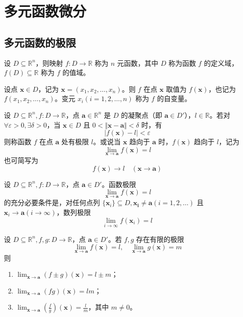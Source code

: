 \chapter{多元函数微分}


\section{多元函数的极限}

\begin{definition}
    设 $D \subseteq \mathbb{R}^n$，则映射 $f: D \to \mathbb{R}$ 称为 $n$ 元函数，其中 $D$ 称为函数 $f$ 的定义域，$f(D) \subseteq \mathbb{R}$ 称为 $f$ 的值域。

    设点 $\bm{x} \in D$，记为 $\bm{x} = (x_1, x_2, \ldots, x_n)$。则 $f$ 在点 $\bm{x}$ 取值为 $f(\bm{x})$，也记为 $f(x_1, x_2, \ldots, x_n)$。变元 $x_{i}(i = 1, 2, \ldots, n)$ 称为 $f$ 的自变量。
\end{definition}

\begin{definition}
    设 $D \subseteq \mathbb{R}^n, f: D \to \mathbb{R}$，点 $\bm{a} \in \mathbb{R}^n$ 是 $D$ 的凝聚点（即 $\bm{a} \in D'$），$l \in \mathbb{R}$。若对 $\forall \varepsilon > 0, \exists \delta > 0$，当 $\bm{x} \in D$ 且 $0 < \Vert \bm{x} - \bm{a} \Vert < \delta$ 时，有
    \[
        \vert f(\bm{x}) - l \vert < \varepsilon
    \]
    则称函数 $f$ 在点 $\bm{a}$ 处有极限 $l$。或说当 $\bm{x}$ 趋向于 $\bm{a}$ 时，$f(\bm{x})$ 趋向于 $l$，记为
    \[
        \lim_{\bm{x} \to \bm{a}} f(\bm{x}) = l
    \]
    也可简写为
    \[
        f(\bm{x}) \to l \quad (\bm{x} \to \bm{a})
    \]
\end{definition}

\begin{theorem}
    设 $D \subseteq \mathbb{R}^n, f: D \to \mathbb{R}$，点 $\bm{a} \in D'$。函数极限
    \[
        \lim_{\bm{x} \to \bm{a}} f(\bm{x}) = l
    \]
    的充分必要条件是，对任何点列 $\{\bm{x}_{i}\} \subseteq D, \bm{x_{i}} \neq \bm{a}(i = 1, 2, \ldots)$ 且 $\bm{x}_{i} \to \bm{a}(i \to \infty)$，数列极限
    \[
        \lim_{i \to \infty} f(\bm{x}_{i}) = l
    \]
\end{theorem}

\begin{theorem}
    设 $D \subseteq \mathbb{R}^n, f, g: D \to \mathbb{R}$，点 $\bm{a} \in D'$。若 $f, g$ 存在有限的极限
    \[
        \lim_{\bm{x} \to \bm{a}} f(\bm{x}) = l,\quad
        \lim_{\bm{x} \to \bm{a}} g(\bm{x}) = m
    \]
    则
    \begin{enumerate}
        \item $\displaystyle \lim_{\bm{x} \to \bm{a}} (f \pm g)(\bm{x}) = l \pm m$；
        \item $\displaystyle \lim_{\bm{x} \to \bm{a}} (fg)(\bm{x}) = lm$；
        \item $\displaystyle \lim_{\bm{x} \to \bm{a}} \left(\frac{f}{g}\right)(\bm{x}) = \frac{l}{m}$，其中 $m \neq 0$。
    \end{enumerate}
\end{theorem}

